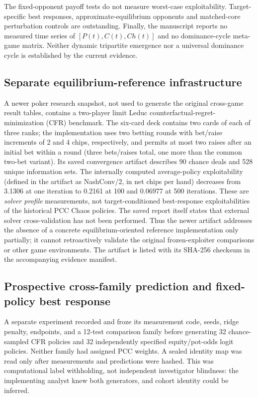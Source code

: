\documentclass[journal]{IEEEtran}
\begin{document}
The fixed-opponent payoff tests do not measure worst-case exploitability. Target-specific best responses, approximate-equilibrium opponents and matched-core perturbation controls are outstanding. Finally, the manuscript reports no measured time series of $[P(t),C(t),Ch(t)]$ and no dominance-cycle meta-game matrix. Neither dynamic tripartite emergence nor a universal dominance cycle is established by the current evidence.

\subsection{Separate equilibrium-reference infrastructure}
\label{sec:newcfr}
A newer poker research snapshot, not used to generate the original cross-game result tables, contains a two-player limit Leduc counterfactual-regret-minimization (CFR) benchmark. The six-card deck contains two cards of each of three ranks; the implementation uses two betting rounds with bet/raise increments of 2 and 4 chips, respectively, and permits at most two raises after an initial bet within a round (three bets/raises total, one more than the common two-bet variant). Its saved convergence artifact describes 90 chance deals and 528 unique information sets. The internally computed average-policy exploitability (defined in the artifact as NashConv/2, in net chips per hand) decreases from 3.1306 at one iteration to 0.2161 at 100 and 0.06977 at 500 iterations. These are \emph{solver profile} measurements, not target-conditioned best-response exploitabilities of the historical PCC Chaos policies. The saved report itself states that external solver cross-validation has not been performed. Thus the newer artifact addresses the absence of a concrete equilibrium-oriented reference implementation only partially; it cannot retroactively validate the original frozen-exploiter comparisons or other game environments. The artifact is listed with its SHA-256 checksum in the accompanying evidence manifest.

\subsection{Prospective cross-family prediction and fixed-policy best response}

A separate experiment recorded and froze its measurement code, seeds, ridge penalty, endpoints, and a 12-test comparison family before generating 32 chance-sampled CFR policies and 32 independently specified equity/pot-odds logit policies. Neither family had assigned PCC weights. A sealed identity map was read only after measurements and predictions were hashed. This was computational label withholding, not independent investigator blindness: the implementing analyst knew both generators, and cohort identity could be inferred.
\end{document}

